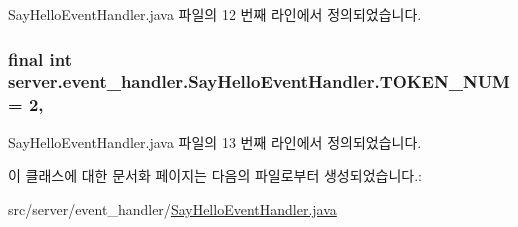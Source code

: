 Say\-Hello\-Event\-Handler.\-java 파일의 12 번째 라인에서 정의되었습니다.

\hypertarget{classserver_1_1event__handler_1_1_say_hello_event_handler_ac843681e595bd544748631948ba3b774}{
\subsubsection[{T\-O\-K\-E\-N\-\_\-\-N\-U\-M}]{\setlength{\rightskip}{0pt plus 5cm}final int server.\-event\-\_\-handler.\-Say\-Hello\-Event\-Handler.\-T\-O\-K\-E\-N\-\_\-\-N\-U\-M = 2\hspace{0.3cm}{\ttfamily [static]}, {\ttfamily [private]}}}\label{classserver_1_1event__handler_1_1_say_hello_event_handler_ac843681e595bd544748631948ba3b774}


Say\-Hello\-Event\-Handler.\-java 파일의 13 번째 라인에서 정의되었습니다.



이 클래스에 대한 문서화 페이지는 다음의 파일로부터 생성되었습니다.\-:\begin{DoxyCompactItemize}
\item 
src/server/event\-\_\-handler/\hyperlink{_say_hello_event_handler_8java}{Say\-Hello\-Event\-Handler.\-java}\end{DoxyCompactItemize}
